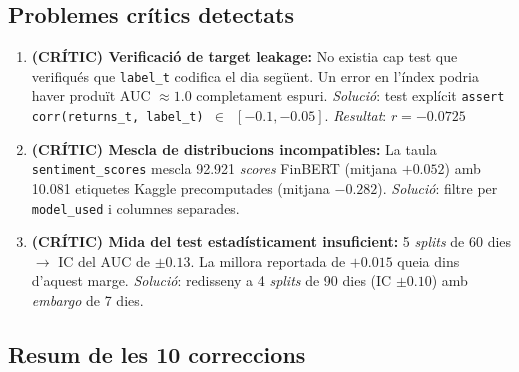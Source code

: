 \documentclass[12pt, a4paper]{report}
\begin{document}
\subsection{Problemes crítics detectats}

\begin{enumerate}
  \item \textbf{(CRÍTIC) Verificació de target leakage:} No existia cap test que verifiqués que \texttt{label\_t} codifica el dia següent. Un error en l'índex podria haver produït AUC $\approx 1.0$ completament espuri. \textit{Solució}: test explícit \texttt{assert corr(returns\_t, label\_t) $\in$ $[-0.1, -0.05]$}. \textit{Resultat}: $r = -0.0725$ \checkmark{}

  \item \textbf{(CRÍTIC) Mescla de distribucions incompatibles:} La taula \texttt{sentiment\_scores} mescla 92.921 \textit{scores} FinBERT (mitjana $+0.052$) amb 10.081 etiquetes Kaggle precomputades (mitjana $-0.282$). \textit{Solució}: filtre per \texttt{model\_used} i columnes separades.

  \item \textbf{(CRÍTIC) Mida del test estadísticament insuficient:} 5 \textit{splits} de 60 dies $\to$ IC del AUC de $\pm 0.13$. La millora reportada de $+0.015$ queia dins d'aquest marge. \textit{Solució}: redisseny a 4 \textit{splits} de 90 dies (IC $\pm 0.10$) amb \textit{embargo} de 7 dies.
\end{enumerate}

\subsection{Resum de les 10 correccions}
\end{document}
